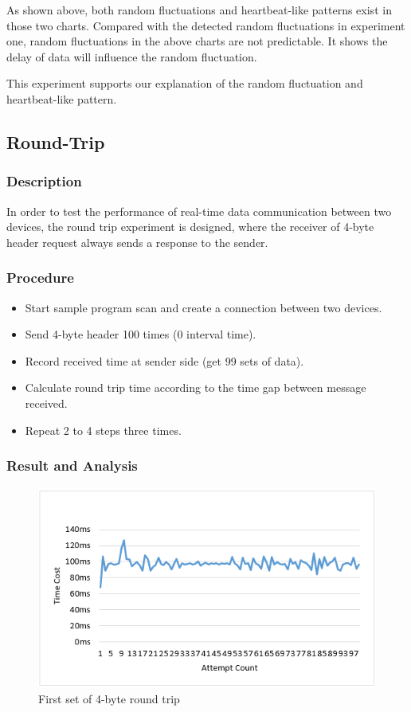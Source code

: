 \documentclass{Nan_Thesis}
\begin{document}
As shown above, both random fluctuations and heartbeat-like patterns exist in those two charts. Compared with the detected random fluctuations in experiment one, random fluctuations in the above charts are not predictable. It shows the delay of data will influence the random fluctuation.

This experiment supports our explanation of the random fluctuation and heartbeat-like pattern.
\subsection{Round-Trip}
\subsubsection{Description}
In order to test the performance of real-time data communication between two devices, the round trip experiment is designed, where the receiver of 4-byte header request always sends a response to the sender.
\subsubsection{Procedure}

\begin{itemize}
  \item Start sample program scan and create a connection between two devices.
  \item Send 4-byte header 100 times (0 interval time).
  \item Record received time at sender side (get 99 sets of data).
  \item Calculate round trip time according to the time gap between message received.
  \item Repeat 2 to 4 steps three times.
\end{itemize}

\subsubsection{Result and Analysis} 
\begin{figure}[H]
  \centering 
      \includegraphics[scale=1]{pic/experiment3result1.png} 
  \caption{First set of 4-byte round trip}
\end{figure}
\end{document}
